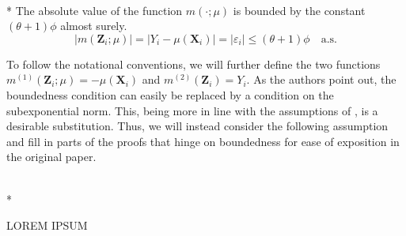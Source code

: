 \begin{boxD}
	\begin{asm}\mbox{}\\*
		The absolute value of the function $m(\cdot; \mu)$ is bounded by the constant $(\theta+1) \phi$ almost surely.
		\begin{equation}
			|m(\mathbf{Z}_i ; \mu)|
			= |Y_i - \mu(\mathbf{X}_i)|
			= |\varepsilon_i|
			\leq (\theta+1) \phi
			\quad \text{a.s.}
		\end{equation}
	\end{asm}
\end{boxD}
To follow the notational conventions, we will further define the two functions $m^{(1)}(\mathbf{Z}_i; \mu) = - \mu(\mathbf{X}_i)$ and $m^{(2)}(\mathbf{Z}_i) = Y_i$.
As the authors point out, the boundedness condition can easily be replaced by a condition on the subexponential norm.
This, being more in line with the assumptions of \citet{demirkaya_optimal_2024}, is a desirable substitution.
Thus, we will instead consider the following assumption and fill in parts of the proofs that hinge on boundedness for ease of exposition in the original paper.

\begin{boxD}
	\begin{asm}\mbox{}\\*

	\end{asm}	
\end{boxD}


{\color{red} LOREM IPSUM}

% 



